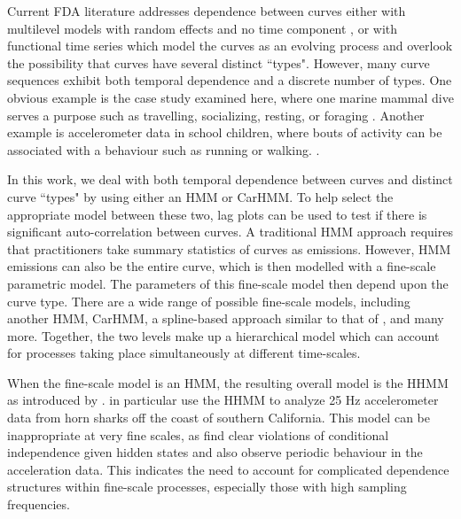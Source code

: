 

Current FDA literature addresses dependence between curves either with multilevel models with random effects and no time component \citep{Chen:2012,Di:2009}, or with functional time series which model the curves as an evolving process \citep{Kokoszka:2018} and overlook the possibility that curves have several distinct ``types". However, many curve sequences exhibit both temporal dependence and a discrete number of types. One obvious example is the case study examined here, where one marine mammal dive serves a purpose such as travelling, socializing, resting, or foraging \citep{Tennessen:2019a}. Another example is accelerometer data in school children, where bouts of activity can be associated with a behaviour such as running or walking. \citep{Morris:2007}.

In this work, we deal with both temporal dependence between curves and distinct curve ``types" by using either an HMM or CarHMM. To help select the appropriate model between these two, lag plots can be used to test if there is significant auto-correlation between curves. A traditional HMM approach requires that practitioners take summary statistics of curves as emissions. However, HMM emissions can also be the entire curve, which is then modelled with a fine-scale parametric model. The parameters of this fine-scale model then depend upon the curve type. There are a wide range of possible fine-scale models, including another HMM, CarHMM, a spline-based approach similar to that of \citet{Langrock:2018}, and many more. Together, the two levels make up a hierarchical model which can account for processes taking place simultaneously at different time-scales.

When the fine-scale model is  an HMM, the resulting overall model is the HHMM as introduced by \citet{Barajas:2017}. \citet{Adam:2019} in particular use the HHMM to analyze 25 Hz accelerometer data from horn sharks off the coast of southern California. This model can be inappropriate at very fine scales, as \citet{Adam:2019} find clear violations of conditional independence given hidden states and also observe periodic behaviour in the acceleration data. This indicates the need to account for complicated dependence structures within fine-scale processes, especially those with high sampling frequencies. 

